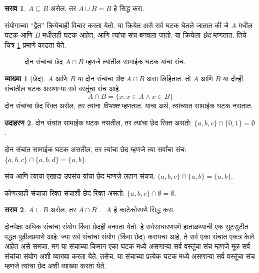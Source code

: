 \documentclass[11pt,a4paper,openany]{book}
\theoremstyle{definition}
\newtheorem{defn}{व्याख्या}[section]
\newtheorem{ex}[defn]{उदाहरण}
\newtheorem{prob}{सराव}[chapter]
\newenvironment{explain}{}{}
\newcommand{\Setabs}[2]{\{#1:#2\}}
\newcommand{\olasset}[2][0.52\textwidth]{\centering\resizebox{#1}{!}{}}
\begin{document}
\begin{prob}
$A \subseteq B$ असेल, तर $A \cup B = B$ हे सिद्ध करा.
\end{prob}

\begin{explain}
संयोगाच्या ``द्वैत'' क्रियेचाही विचार करता येतो. या क्रियेत असे सर्व
घटक घेतले जातात की जे $A$ मधील घटक आणि
$B$ मधीलही घटक आहेत, आणि त्यांचा संच बनवला जातो.
या क्रियेला \emph{छेद} म्हणतात. तिचे चित्र \ref{sfr:set:uni:fig:intersection} प्रमाणे काढता येते.
\begin{figure}
  \olasset{assets/diagrams/intersection.tikz}
  \caption{दोन संचांचा छेद $A \cap B$ म्हणजे त्यांतील सामाईक
    घटक यांचा संच.}
  \label{sfr:set:uni:fig:intersection}
\end{figure}
\end{explain}

\begin{defn}[छेद]
$A$ आणि $B$ या दोन संचांचा \emph{छेद} $A \cap B$ असा लिहितात.
तो $A$ आणि $B$ या दोन्ही संचांतील घटक असणाऱ्या सर्व वस्तूंचा संच आहे.
\[
A \cap B = \Setabs{x}{x \in A \land x \in B}
\]
दोन संचांचा छेद रिक्त असेल, तर त्यांना \emph{विभक्त} म्हणतात.
याचा अर्थ, त्यांच्यात सामाईक घटक नसतात.
\end{defn}

\begin{ex}
दोन संचांत सामाईक घटक नसतील, तर त्यांचा छेद रिक्त असतो:
$\{ a, b, c\} \cap \{ 0, 1\} = \emptyset$.

दोन संचांत सामाईक घटक असतील, तर त्यांचा छेद म्हणजे त्या सर्वांचा संच:
$\{a, b, c \} \cap \{a, b, d \} = \{a, b\}$.

संच आणि त्याचा एखादा उपसंच यांचा छेद म्हणजे लहान संचच:
$\{a, b, c\} \cap \{a, b\} = \{a, b\}$.

कोणत्याही संचाचा रिक्त संचाशी छेद रिक्त असतो:
$\{a, b, c \}
\cap \emptyset = \emptyset$.
\end{ex}

\begin{prob}
$A \subseteq B$ असेल, तर $A \cap B = A$ हे काटेकोरपणे सिद्ध करा.
\end{prob}

\begin{explain}
दोनपेक्षा अधिक संचांचा संयोग किंवा छेदही बनवता येतो.
हे सर्वसाधारणपणे हाताळण्याची एक सुटसुटीत पद्धत पुढीलप्रमाणे आहे:
ज्या सर्व संचांचा संयोग (किंवा छेद) करायचा आहे, ते सर्व एका संचात एकत्र केले आहेत असे समजा.
मग या संचाच्या किमान एका घटक मध्ये असणाऱ्या सर्व वस्तूंचा संच
म्हणजे मूळ सर्व संचांचा संयोग अशी व्याख्या करता येते.
तसेच, या संचाच्या प्रत्येक घटक मध्ये असणाऱ्या सर्व वस्तूंचा संच
म्हणजे त्यांचा छेद अशी व्याख्या करता येते.
\end{explain}
\end{document}
